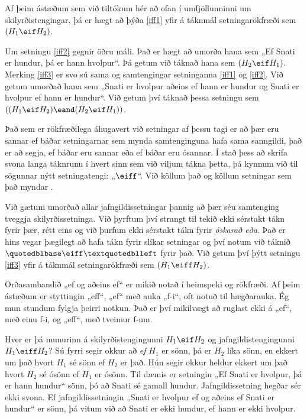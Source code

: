 Af þeim ástæðum sem við tiltókum hér að ofan í umfjöllunninni um skilyrðistengingar, þá er hægt að þýða \ref{iff1} yfir á táknmál setningarökfræði sem $(H_1 \eif H_2)$.

Um setningu \ref{iff2} gegnir öðru máli. Það er hægt að umorða hana sem „Ef Snati er hundur, þá er hann hvolpur“. Þá getum við táknað hana sem $(H_2 \eif H_1)$. Merking \ref{iff3} er svo sú sama og samtengingar setninganna \ref{iff1} og \ref{iff2}. Við getum umorðað hana sem „Snati er hvolpur aðeins ef hann er hundur og Snati er hvolpur ef hann er hundur“. Við getum því táknað þessa setningu sem $((H_1 \eif H_2) \eand (H_2 \eif H_1))$. 

Það sem er rökfræðilega áhugavert við setningar af þessu tagi er að þær eru sannar ef báðar setningarnar sem mynda samtenginguna hafa sama sanngildi, það er að segja, ef báðar eru sannar eða ef báðar eru ósannar. Í stað þess að skrifa svona langa táknrunu í hvert sinn sem við viljum tákna þetta, þá kynnum við til sögunnar nýtt setningatengi: „$\eiff$“. Við köllum það  og köllum setningar sem það myndar .

Við gætum umorðað allar jafngildissetningar þannig að þær séu samtenging tveggja skilyrðissetninga. Við þyrftum því strangt til tekið ekki sérstakt tákn fyrir þær, rétt eins og við þurfum ekki sérstakt tákn fyrir \emph{óskarað eða}. Það er hins vegar þægilegt að hafa tákn fyrir slíkar setningar og því notum við táknið $„\eiff“$ fyrir það. Við getum því þýtt setningu \ref{iff3} yfir á táknmál setningarökfræði sem $(H_1 \eiff H_2)$.

Orðasambandið „ef og aðeins ef“ er mikið notað í heimspeki og rökfræði. Af þeim ástæðum er styttingin „eff“, „ef“ með auka „f-i“, oft notuð til hægðarauka. Ég mun stundum fylgja þeirri notkun. Það er því mikilvægt að ruglast ekki á „ef“, með einu f-i, og „eff“, með tveimur f-um.

Hver er þá munurinn á skilyrðistengingunni $H_1 \eif H_2$ og jafngildistengingunni $H_1 \eiff H_2$? Sú fyrri segir okkur að \emph{ef} $H_1$ er sönn, þá er $H_2$ líka sönn, en ekkert um það hvort $H_1$ sé sönn ef $H_2$ er það. Hún segir okkur heldur ekkert um það hvort $H_2$ sé ósönn ef $H_1$ er ósönn. Til dæmis er setningin „Ef Snati er hvolpur, þá er hann hundur“ sönn, þó að Snati sé gamall hundur. Jafngildissetning hegðar sér ekki svona. Ef jafngildissetningin „Snati er hvolpur ef og aðeins ef Snati er hundur“ er sönn, þá vitum við að Snati er ekki hundur, ef hann er ekki hvolpur.
	
